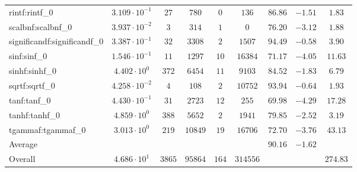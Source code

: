 \begin{tabular}{|l|c|c|c|c|c|c|c|c|}
rintf:rintf\_0               & $ 3.109 \cdot 10^{-1} $ & $ 27     $ & $ 780   $ & $ 0   $ & $ 136    $ & $ 86.86       $ & $ -1.51   $ & $ 1.83    $ \\
scalbnf:scalbnf\_0           & $ 3.937 \cdot 10^{-2} $ & $ 3      $ & $ 314   $ & $ 1   $ & $ 0      $ & $ 76.20       $ & $ -3.12   $ & $ 1.88    $ \\
significandf:significandf\_0 & $ 3.387 \cdot 10^{-1} $ & $ 32     $ & $ 3308  $ & $ 2   $ & $ 1507   $ & $ 94.49       $ & $ -0.58   $ & $ 3.90    $ \\
sinf:sinf\_0                 & $ 1.546 \cdot 10^{-1} $ & $ 11     $ & $ 1297  $ & $ 10  $ & $ 16384  $ & $ 71.17       $ & $ -4.05   $ & $ 11.63   $ \\
sinhf:sinhf\_0               & $ 4.402 \cdot 10^{0}  $ & $ 372    $ & $ 6454  $ & $ 11  $ & $ 9103   $ & $ 84.52       $ & $ -1.83   $ & $ 6.79    $ \\
sqrtf:sqrtf\_0               & $ 4.258 \cdot 10^{-2} $ & $ 4      $ & $ 108   $ & $ 2   $ & $ 10752  $ & $ 93.94       $ & $ -0.64   $ & $ 1.93    $ \\
tanf:tanf\_0                 & $ 4.430 \cdot 10^{-1} $ & $ 31     $ & $ 2723  $ & $ 12  $ & $ 255    $ & $ 69.98       $ & $ -4.29   $ & $ 17.28   $ \\
tanhf:tanhf\_0               & $ 4.859 \cdot 10^{0}  $ & $ 388    $ & $ 5652  $ & $ 2   $ & $ 1941   $ & $ 79.85       $ & $ -2.52   $ & $ 3.19    $ \\
tgammaf:tgammaf\_0           & $ 3.013 \cdot 10^{0}  $ & $ 219    $ & $ 10849 $ & $ 19  $ & $ 16706  $ & $ 72.70       $ & $ -3.76   $ & $ 43.13   $ \\
\hline
Average                      & $                     $ & $        $ & $       $ & $     $ & $        $ & $ 90.16       $ & $ -1.62   $ & $         $ \\
\hline
Overall                      & $ 4.686 \cdot 10^{1}  $ & $ 3865   $ & $ 95864 $ & $ 164 $ & $ 314556 $ & $             $ & $         $ & $ 274.83  $ \\
\hline
\end{tabular}
